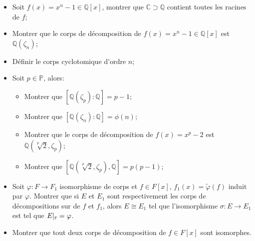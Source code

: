 \documentclass[executivepaper,leqno]{amsart}
\begin{document}
\begin{itemize}
    \item Soit $f(x) = x^n-1 \in \mathbb Q[x]$, montrer que $\mathbb C \supset \mathbb Q$ contient toutes les racines de $f$;
    \item Montrer que le corps de d\'ecomposition de $f(x) = x^n-1 \in \mathbb Q[x]$ est $\mathbb Q(\zeta_n)$;
    \item D\'efinir le corps cyclotomique d'ordre $n$;
    \item Soit $p \in \mathbb P$, alors:
    \begin{itemize}
        \item Montrer que $[\mathbb Q(\zeta_p):\mathbb Q] = p-1$;
        \item Montrer que $[\mathbb Q(\zeta_n):\mathbb Q] = \phi(n)$;
        \item Montrer que le corps de d\'ecomposition de $f(x) = x^p-2$ est $\mathbb Q(\sqrt[p]2,\zeta_p)$;
        \item Montrer que $[\mathbb Q(\sqrt[p]2,\zeta_p),\mathbb Q]=p(p-1)$;
    \end{itemize}
    \item Soit $\varphi\colon F \to F_1$ isomorphisme de corps et $f \in F[x]$, $f_1(x) = \tilde\varphi(f)$
        induit par $\varphi$. Montrer que si $E$ et $E_1$ sont respectivement les corps de d\'ecompositions
        sur de $f$ et $f_1$, alors $E \cong E_1$ tel que l'isomorphisme $\sigma \colon E \to E_1$ est tel que
        $E|_\textsc f = \varphi$.
    \item Montrer que tout deux corps de d\'ecomposition de $f \in F[x]$ sont isomorphes.
\end{itemize}
\end{document}
